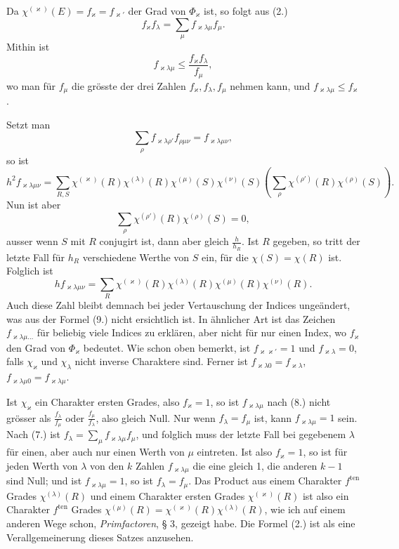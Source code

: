 \documentclass[11pt]{article}
\newcommand{\ten}{\mathrm{ten}}
\begin{document}
Da $\chi^{(\varkappa)}(E)=f_\varkappa=f_{\varkappa'}$ der Grad von $\Phi_\varkappa$ ist, so folgt aus (2.)
\begin{equation*}\tag{7.}
f_\varkappa f_\lambda=\sum_\mu f_{\varkappa\lambda\mu}f_\mu.
\end{equation*}
Mithin ist
\begin{equation*}\tag{8.}
f_{\varkappa\lambda\mu}\leq \frac{f_\varkappa f_\lambda}{f_\mu},
\end{equation*}
wo man für $f_\mu$ die grösste der drei Zahlen $f_\varkappa,f_\lambda,f_\mu$ nehmen kann, und $f_{\varkappa\lambda\mu}\leq f_\varkappa$.

Setzt man
\begin{equation*}\tag{9.}
\sum_\rho f_{\varkappa\lambda\rho'}f_{\rho\mu\nu}=f_{\varkappa\lambda\mu\nu},
\end{equation*}
so ist
\[
h^2 f_{\varkappa\lambda\mu\nu}
=\sum_{R,S}\chi^{(\varkappa)}(R)\chi^{(\lambda)}(R)\chi^{(\mu)}(S)\chi^{(\nu)}(S)
\left(\sum_\rho\chi^{(\rho')}(R)\chi^{(\rho)}(S)\right).
\]
Nun ist aber
\[
\sum_\rho\chi^{(\rho')}(R)\chi^{(\rho)}(S)=0,
\]
ausser wenn $S$ mit $R$ conjugirt ist, dann aber gleich $\frac{h}{h_R}$. Ist $R$ gegeben, so tritt der letzte Fall für $h_R$ verschiedene Werthe von $S$ ein, für die $\chi(S)=\chi(R)$ ist. Folglich ist
\begin{equation*}\tag{10.}
h f_{\varkappa\lambda\mu\nu}
=\sum_R \chi^{(\varkappa)}(R)\chi^{(\lambda)}(R)\chi^{(\mu)}(R)\chi^{(\nu)}(R).
\end{equation*}
Auch diese Zahl bleibt demnach bei jeder Vertauschung der Indices ungeändert, was aus der Formel (9.) nicht ersichtlich ist. In ähnlicher Art ist das Zeichen $f_{\varkappa\lambda\mu\ldots}$ für beliebig viele Indices zu erklären, aber nicht für nur einen Index, wo $f_\varkappa$ den Grad von $\Phi_\varkappa$ bedeutet. Wie schon oben bemerkt, ist $f_{\varkappa\varkappa'}=1$ und $f_{\varkappa\lambda}=0$, falls $\chi_\varkappa$ und $\chi_\lambda$ nicht inverse Charaktere sind. Ferner ist $f_{\varkappa\lambda 0}=f_{\varkappa\lambda}$, $f_{\varkappa\lambda\mu0}=f_{\varkappa\lambda\mu}$.

Ist $\chi_\varkappa$ ein Charakter ersten Grades, also $f_\varkappa=1$, so ist $f_{\varkappa\lambda\mu}$ nach (8.) nicht grösser als $\frac{f_\lambda}{f_\mu}$ oder $\frac{f_\mu}{f_\lambda}$, also gleich Null. Nur wenn $f_\lambda=f_\mu$ ist, kann $f_{\varkappa\lambda\mu}=1$ sein. Nach (7.) ist $f_\lambda=\sum_\mu f_{\varkappa\lambda\mu}f_\mu$, und folglich muss der letzte Fall bei gegebenem $\lambda$ für einen, aber auch nur einen Werth von $\mu$ eintreten. Ist also $f_\varkappa=1$, so ist für jeden Werth von $\lambda$ von den $k$ Zahlen $f_{\varkappa\lambda\mu}$ die eine gleich 1, die anderen $k-1$ sind Null; und ist $f_{\varkappa\lambda\mu}=1$, so ist $f_\lambda=f_\mu$. Das Product aus einem Charakter $f^{\ten}$ Grades $\chi^{(\lambda)}(R)$ und einem Charakter ersten Grades $\chi^{(\varkappa)}(R)$ ist also ein Charakter $f^{\ten}$ Grades $\chi^{(\mu)}(R)=\chi^{(\varkappa)}(R)\chi^{(\lambda)}(R)$, wie ich auf einem anderen Wege schon, \emph{Primfactoren}, § 3, gezeigt habe. Die Formel (2.) ist als eine Verallgemeinerung dieses Satzes anzusehen.
\end{document}
